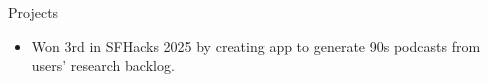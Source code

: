 \documentclass{resume} %
\begin{document}
\begin{workSection}{Projects}

	\customItem[
	title=\href{https://github.com/chesterCaii/back-logz/}{Backlogz }, %
	technologies= | React Native{,} Expo-Router{,} TypeScript
	]
	\begin{itemize}
		\vspace{-0.5em}
		\itemsep -6pt {}
		\item Won 3rd in SFHacks 2025 by creating app to generate 90s podcasts from users' research backlog.
	\end{itemize}
	
	
	

\end{workSection}
\end{document}
